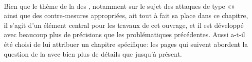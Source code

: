 \paragraph{}
Bien que le thème de la \secu des \rcsfs, notamment sur le sujet des attaques de type «\dds» ainsi que des contre-mesures appropriées, ait tout à fait sa place dans ce chapitre, il s'agit d'un élément central pour les travaux de cet ouvrage, et il est développé avec beaucoup plus de précisions que les problématiques précédentes.
Aussi a-t-il été choisi de lui attribuer un chapitre spécifique: les pages qui suivent abordent la question de la \secu avec bien plus de détails que jusqu'à présent.
